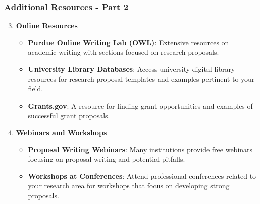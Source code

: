 \documentclass[aspectratio=169]{beamer}
\begin{document}
\begin{frame}[fragile]
    \frametitle{Additional Resources - Part 2}
    \begin{enumerate}
        \setcounter{enumi}{2}
        \item \textbf{Online Resources}
        \begin{itemize}
            \item \textbf{Purdue Online Writing Lab (OWL)}: Extensive resources on academic writing with sections focused on research proposals.
            \item \textbf{University Library Databases}: Access university digital library resources for research proposal templates and examples pertinent to your field.
            \item \textbf{Grants.gov}: A resource for finding grant opportunities and examples of successful grant proposals.
        \end{itemize}

        \item \textbf{Webinars and Workshops}
        \begin{itemize}
            \item \textbf{Proposal Writing Webinars}: Many institutions provide free webinars focusing on proposal writing and potential pitfalls.
            \item \textbf{Workshops at Conferences}: Attend professional conferences related to your research area for workshops that focus on developing strong proposals.
        \end{itemize}
    \end{enumerate}
\end{frame}
\end{document}
